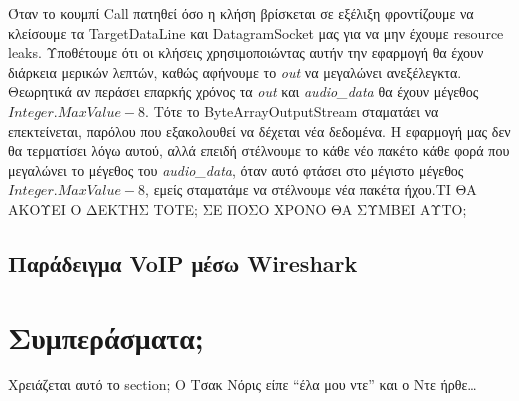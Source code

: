 \documentclass{article}
\begin{document}
Όταν το κουμπί Call πατηθεί όσο η κλήση βρίσκεται σε εξέλιξη φροντίζουμε να κλείσουμε τα TargetDataLine
και DatagramSocket μας για να μην έχουμε resource leaks. Υποθέτουμε ότι οι κλήσεις χρησιμοποιώντας 
αυτήν την εφαρμογή θα έχουν διάρκεια μερικών λεπτών, καθώς αφήνουμε το \textit{out} να μεγαλώνει 
ανεξέλεγκτα. Θεωρητικά αν περάσει επαρκής χρόνος τα \textit{out} και \textit{audio\_data} θα 
έχουν μέγεθος $Integer.MaxValue - 8$. Τότε το ByteArrayOutputStream σταματάει να επεκτείνεται, παρόλου
που εξακολουθεί να δέχεται νέα δεδομένα. Η εφαρμογή μας δεν θα τερματίσει λόγω αυτού, αλλά επειδή 
στέλνουμε το κάθε νέο πακέτο κάθε φορά που μεγαλώνει το μέγεθος του \textit{audio\_data}, όταν αυτό φτάσει 
στο μέγιστο μέγεθος $Integer.MaxValue - 8$, εμείς σταματάμε να στέλνουμε νέα πακέτα ήχου.ΤΙ ΘΑ ΑΚΟΥΕΙ Ο ΔΕΚΤΗΣ ΤΟΤΕ;
ΣΕ ΠΟΣΟ ΧΡΟΝΟ ΘΑ ΣΥΜΒΕΙ ΑΥΤΟ;


\subsection{Παράδειγμα VoIP μέσω Wireshark}
\section{Συμπεράσματα;}
Χρειάζεται αυτό το section; Ο Τσακ Νόρις είπε ``έλα μου ντε'' και ο Ντε ήρθε\ldots
\end{document}
